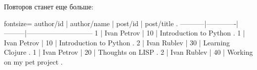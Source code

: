 Повторов станет еще больше:




\iflarge

\begin{english}
  \begin{text*}{fontsize=\small}
 author/id | author/name | post/id |         post/title         .
-----------|-------------|---------|-----------------------------
         1 | Ivan Petrov |      10 | Introduction to Python     .
         1 | Ivan Petrov |      10 | Introduction to Python     .
         2 | Ivan Rublev |      30 | Learning Clojure           .
         1 | Ivan Petrov |      20 | Thoughts on LISP           .
         2 | Ivan Rublev |      40 | Working on my pet project  .
  \end{text*}
\end{english}

